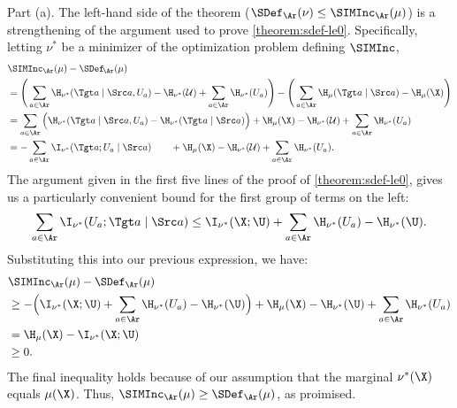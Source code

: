 \begin{subappendices}
\begin{lproof}
        \label{proof:siminc-idef-bounds}
    Part (a).  The left-hand side of the theorem 
    ($\SDef_{\Ar}(\nu)\le\SIMInc_{\Ar}(\mu)$)
    is a strengthening of the argument used to prove \cref{theorem:sdef-le0}. 
    Specifically,
    letting $\nu^*$ be a minimizer of 
        the optimization problem defining $\SIMInc$,
    \allowdisplaybreaks
    \begin{align*}
        &\SIMInc_{\Ar}(\mu) - \SDef_{\!\Ar}(\mu) 
        \\
        &= \left( \,
        \sum_{a \in \Ar} \H_{\nu^*}(\Tgt a \mid \Src a, U_a) - \H_{\nu^*}(\mathcal U) + \sum_{a \in \Ar} \H_{\nu^*}(U_a)
        \right) - \left(\,
        \sum_{a \in \Ar}\H_\mu(\Tgt a \mid \Src a) - \H_\mu(\X) \right)\\
        &=
        \sum_{a \in \Ar} \Big( \H_{\nu^*}(\Tgt a \mid \Src a, U_a) - \H_{\nu^*}(\Tgt a \mid \Src a) \Big)
            + \H_\mu(\X)
            - \H_{\nu^*}(\mathcal U) + \sum_{a \in \Ar} \H_{\nu^*}(U_a)
        \\
        &=
        - \sum_{a \in \Ar} \I_{\nu^*}( \Tgt a ; U_a \mid \Src a)
            \qquad + \H_\mu(\X)
            - \H_{\nu^*}(\mathcal U) + \sum_{a \in \Ar} \H_{\nu^*}(U_a).
    \end{align*}
    The argument given in the first five lines of the proof of \cref{theorem:sdef-le0}, gives us a particularly convenient bound for the first group of terms on the left:
    \[
        \sum_{a \in \Ar} \I_{\nu^*} (U_a ; \Tgt a\mid \Src a) 
        \le \I_{\nu^*}(\X; \U) + \sum_{a \in \Ar} \H_{\nu^*}(U_a) - \H_{\nu^*}(\U).
    \]
    Substituting this into our previous expression, we have:
    \begin{align*}
        &\SIMInc_{\Ar}(\mu) - \SDef_{\Ar}(\mu) 
        \\
        &\ge - \Big(\I_{\nu^*}(\X; \U) + \sum_{a \in \Ar} \H_{\nu^*}(U_a) - \H_{\nu^*}(\U) \Big)
            + \H_\mu(\X) - \H_{\nu^*}(\U) + \sum_{a \in \Ar} \H_{\nu^*}(U_a)
        \\
        &= \H_\mu(\X) - \I_{\nu^*}(\X ; \U)
        \\
        &\ge 0. 
    \end{align*}
    The final inequality holds because of our assumption that the marginal $\nu^*(\X)$ equals $\mu(\X)$. 
    Thus, $\SIMInc_{\Ar}(\mu) \ge \SDef_{\Ar}(\mu)$, as proimised.


\end{lproof}
\end{subappendices}
